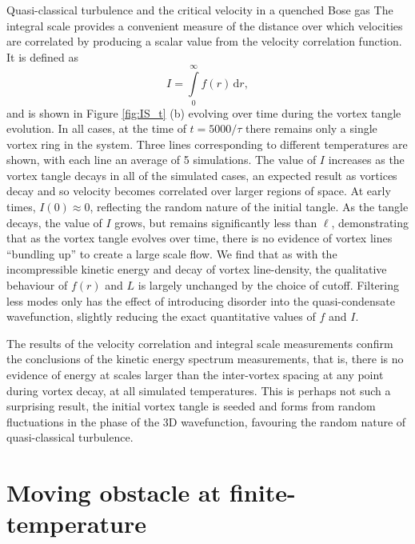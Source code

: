 \begin{chapter}{\label{cha:nonequib}Quasi-classical turbulence and the critical velocity in a quenched Bose gas}
The integral scale provides a convenient measure of the distance over which velocities are correlated by producing a scalar value from the velocity correlation function. It is defined as
\begin{equation}
I = \int\limits_0^\infty\! f(r)\, \mathrm{d}r,
\end{equation}
and is shown in Figure \ref{fig:IS_t} (b) evolving over time during the vortex tangle evolution. In all cases, at the time of $t=5000/\tau$ there remains only a single vortex ring in the system. Three lines corresponding to different temperatures are shown, with each line an average of 5 simulations. The value of $I$ increases as the vortex tangle decays in all of the simulated cases, an expected result as vortices decay and so velocity becomes correlated over larger regions of space. At early times, $I(0)\approx0$, reflecting the random nature of the initial tangle. As the tangle decays, the value of $I$ grows, but remains significantly less than $\ell$, demonstrating that as the vortex tangle evolves over time, there is no evidence of vortex lines ``bundling up'' to create a large scale flow. We find that as with the incompressible kinetic energy and decay of vortex line-density, the qualitative behaviour of $f(r)$ and $L$ is largely unchanged by the choice of cutoff. Filtering less modes only has the effect of introducing disorder into the quasi-condensate wavefunction, slightly reducing the exact quantitative values of $f$ and $I$. 

The results of the velocity correlation and integral scale measurements confirm the conclusions of the kinetic energy spectrum measurements, that is, there is no evidence of energy at scales larger than the inter-vortex spacing at any point during vortex decay, at all simulated temperatures. This is perhaps not such a surprising result, the initial vortex tangle is seeded and forms from random fluctuations in the phase of the 3D wavefunction, favouring the random nature of quasi-classical turbulence.


\section{Moving obstacle at finite-temperature\label{sec:obstacle}}

\end{chapter}
